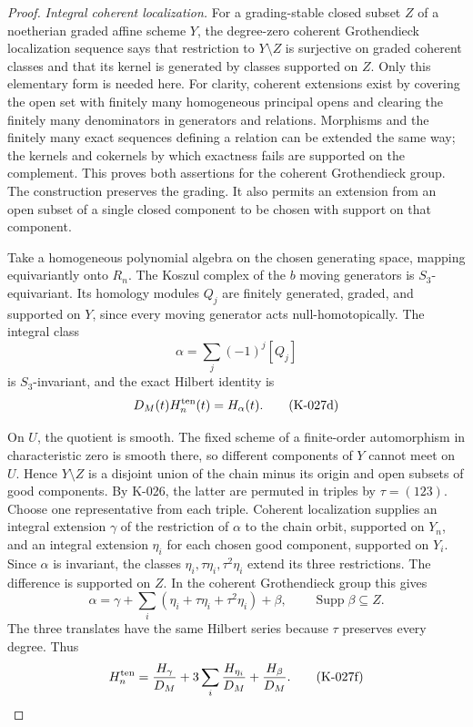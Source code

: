 \begin{proof}
\emph{Integral coherent localization.}
For a grading-stable closed subset $Z$ of a noetherian graded affine
scheme $Y$, the degree-zero coherent Grothendieck localization
sequence says that restriction to $Y\setminus Z$ is surjective on
graded coherent classes and that its kernel is generated by classes
supported on $Z$.  Only this elementary form is needed here.
For clarity, coherent extensions exist by covering the open set with
finitely many homogeneous principal opens and clearing the finitely
many denominators in generators and relations.  Morphisms and the
finitely many exact sequences defining a relation can be extended
the same way; the kernels and cokernels by which exactness fails are
supported on the complement.  This proves both assertions for the
coherent Grothendieck group.  The construction preserves the grading.
It also permits an extension from an open subset of a single closed
component to be chosen with support on that component.

Take a homogeneous polynomial algebra on the chosen generating
space, mapping equivariantly onto $R_n$.  The Koszul complex of the
$b$ moving generators is $S_3$-equivariant.  Its homology modules
$Q_j$ are finitely generated, graded, and supported on $Y$, since
every moving generator acts null-homotopically.  The integral class
\[
                          \alpha=\sum_j(-1)^j[Q_j]
\]
is $S_3$-invariant, and the exact Hilbert identity is
\[
                       D_M(t)H_n^{\rm ten}(t)=H_\alpha(t).
                                                        \tag{K-027d}
\]

On $U$, the quotient is smooth.  The fixed scheme of a finite-order
automorphism in characteristic zero is smooth there, so different
components of $Y$ cannot meet on $U$.  Hence $Y\setminus Z$ is a
disjoint union of the chain minus its origin and open subsets of
good components.  By K-026, the latter are permuted in triples by
$\tau=(123)$.  Choose one representative from each triple.
Coherent localization supplies an integral extension $\gamma$ of
the restriction of $\alpha$ to the chain orbit, supported on $Y_n$,
and an integral extension $\eta_i$ for each chosen good component,
supported on $Y_i$.  Since $\alpha$ is invariant, the classes
$\eta_i,\tau\eta_i,\tau^2\eta_i$ extend its three restrictions.
The difference is supported on $Z$.  In the coherent Grothendieck
group this gives
\[
 \alpha=\gamma+
       \sum_i(\eta_i+\tau\eta_i+\tau^2\eta_i)+\beta,
 \qquad \operatorname{Supp}\beta\subseteq Z.
                                                        \tag{K-027e}
\]
The three translates have the same Hilbert series because $\tau$
preserves every degree.  Thus
\[
 H_n^{\rm ten}
       =\frac{H_\gamma}{D_M}
          +3\sum_i\frac{H_{\eta_i}}{D_M}
          +\frac{H_\beta}{D_M}.
                                                        \tag{K-027f}
\]


\end{proof}
